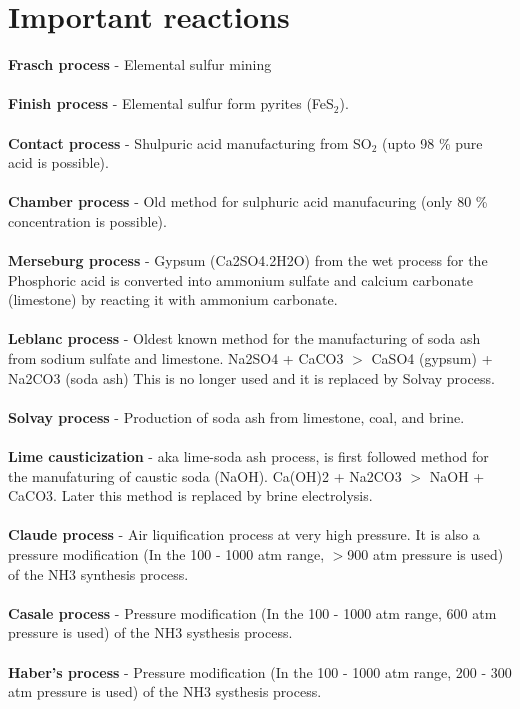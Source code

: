 \documentclass[12pt,a4paper]{article}
\begin{document}
\section{Important reactions}
\noindent \textbf{Frasch process} - Elemental sulfur mining\\ \\
\textbf{Finish process} - Elemental sulfur form pyrites (FeS$_2$).\\ \\
\textbf{Contact process} - Shulpuric acid manufacturing from SO$_2$ (upto 98 \% pure acid is possible).\\ \\
\textbf{Chamber process} - Old method for sulphuric acid manufacuring (only 80 \% concentration is possible).\\ \\
\textbf{Merseburg process} - Gypsum (Ca2SO4.2H2O) from the wet process for the Phosphoric acid is converted into ammonium sulfate and calcium carbonate (limestone) by reacting it with ammonium carbonate.\\ \\
\textbf{Leblanc process} - Oldest known method for the manufacturing of soda ash from sodium sulfate and limestone. Na2SO4 + CaCO3 $>$ CaSO4 (gypsum) + Na2CO3 (soda ash) This is no longer used and it is replaced by Solvay process.\\ \\
\textbf{Solvay process} - Production of soda ash from limestone, coal, and brine. \\ \\
\textbf{Lime causticization} - aka lime-soda ash process, is first followed method for the manufaturing of caustic soda (NaOH). Ca(OH)2 + Na2CO3 $>$ NaOH + CaCO3. Later this method is replaced by brine electrolysis. \\ \\ 
\textbf{Claude process} - Air liquification process at very high pressure. It is also a pressure modification (In the 100 - 1000  atm range, $>$900 atm pressure is used) of the NH3 synthesis process.\\ \\ 
\textbf{Casale process} - Pressure modification (In the 100 - 1000  atm range, 600 atm pressure is used) of the NH3 systhesis process.\\ \\ 
\textbf{Haber's process} - Pressure modification (In the 100 - 1000  atm range, 200 - 300 atm pressure is used) of the NH3 systhesis process.\\ \\ 
\end{document}
